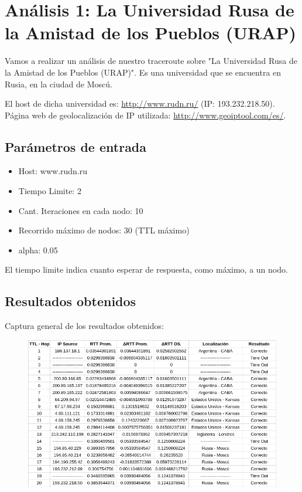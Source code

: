 \section{An\'alisis 1: La Universidad Rusa de la Amistad de los Pueblos (URAP)}
Vamos a realizar un an\'alisis de nuestro traceroute sobre "La Universidad Rusa de la Amistad de los Pueblos (URAP)". Es una universidad que se encuentra en Rusia, en la ciudad de Mosc\'u.\newline

El host de dicha universidad es: \url{http://www.rudn.ru/} (IP: 193.232.218.50).\\
	
Página web de geolocalización de IP utilizada: \url{http://www.geoiptool.com/es/}.

\subsection{Par\'ametros de entrada}
\begin{itemize}
\item Host: www.rudn.ru
\item Tiempo Limite: 2
\item Cant. Iteraciones en cada nodo: 10
\item Recorrido m\'aximo de nodos: 30 (TTL m\'aximo)
\item alpha: 0.05
\end{itemize}
El tiempo limite indica cuanto esperar de respuesta, como m\'aximo, a un nodo.\newline

\subsection{Resultados obtenidos}

Captura general de los resultados obtenidos:

\begin{figure}[h]
    \includegraphics[width=1\textwidth]{img_analisis1/tabla.png}
    
\end{figure}
\vspace{0.25cm}


